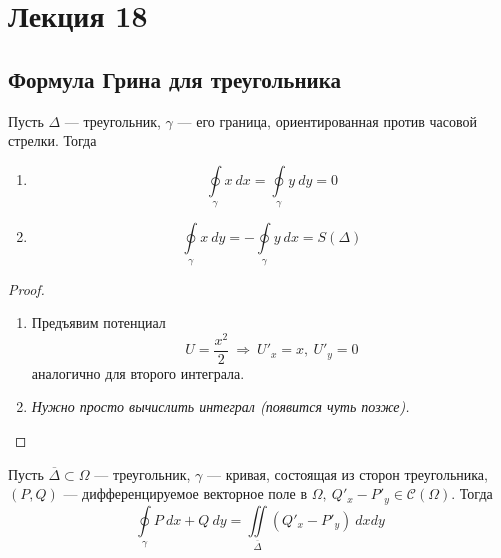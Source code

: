 \section{Лекция 18}
\subsection{Формула Грина для треугольника}
\begin{lemma}\label{lem18} Пусть $\Delta$ --- треугольник, $\gamma$ --- его граница, ориентированная против часовой стрелки. Тогда  
    \begin{enumerate}
        \item \[\oint\limits_{\gamma}x\ dx=\oint\limits_{\gamma}y\ dy=0\]
        \item \[\oint\limits_{\gamma}x\ dy=-\oint\limits_{\gamma}y\ dx=S(\Delta)\]
    \end{enumerate}
\end{lemma}
\begin{proof}\tab
    \begin{enumerate}
        \item Предъявим потенциал 
        \[U=\frac{x^2}{2}\ \Rightarrow\ U'_x=x,\ U'_y=0\] 
        аналогично для второго интеграла.
        \item \textit{Нужно просто вычислить интеграл (появится чуть позже).}
    \end{enumerate}
\end{proof}
\begin{theorem}\label{grintreyg}
    Пусть $\overline{\Delta}\subset \Omega$ --- треугольник, $\gamma$ --- кривая, состоящая из сторон треугольника, $(P,Q)$ --- дифференцируемое векторное поле в $\Omega,\ Q'_x-P'_y\in \mathcal{C}(\Omega)$. Тогда
    \[\oint\limits_{\gamma}P\ dx+Q\ dy=\iint\limits_{\overline{\Delta}}(Q'_x-P'_y)\ dxdy\]
\end{theorem}
